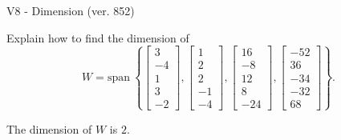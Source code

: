 \begin{exercise}
  \begin{exerciseTitle}V8 - Dimension (ver. 852)\end{exerciseTitle}
  \begin{exerciseStatement}
    Explain how to find the dimension of 
\[W=\mathrm{span}\ \left\{\left[\begin{array}{r}
3 \\
-4 \\
1 \\
3 \\
-2
\end{array}\right] , \left[\begin{array}{r}
1 \\
2 \\
2 \\
-1 \\
-4
\end{array}\right] , \left[\begin{array}{r}
16 \\
-8 \\
12 \\
8 \\
-24
\end{array}\right] , \left[\begin{array}{r}
-52 \\
36 \\
-34 \\
-32 \\
68
\end{array}\right]\right\}.\]



  \end{exerciseStatement}
  \begin{exerciseAnswer}
   The dimension of \(W\) is  \(2\).
  


  \end{exerciseAnswer}
\end{exercise}